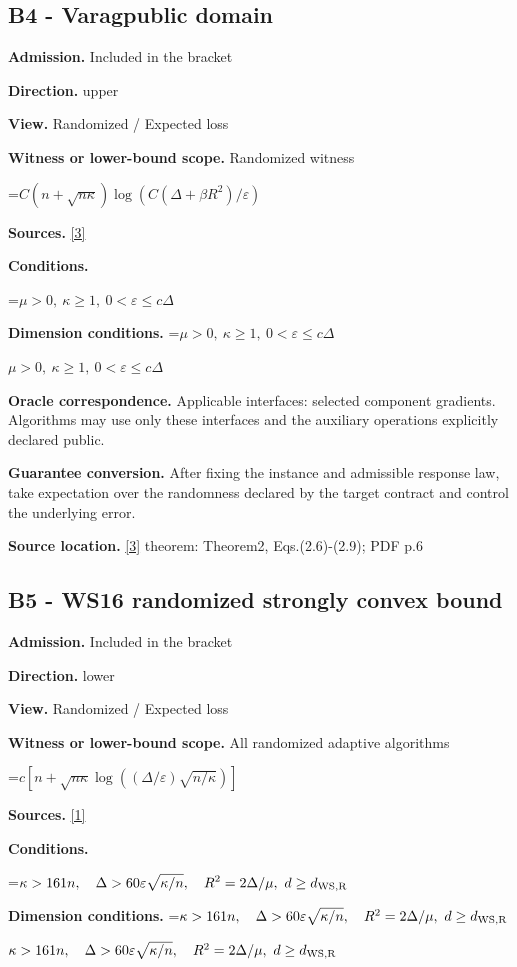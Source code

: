 \documentclass[10pt,a4paper]{article}
\newcommand{\AtlasMath}[1]{\par\begingroup\centering\setbox0=\hbox{$\displaystyle #1$}\ifdim\wd0>1.4\linewidth\typeout{ATLAS WIDE FORMULA: \the\wd0}\fi\ifdim\wd0>\linewidth\resizebox{\linewidth}{!}{\box0}\else\box0\fi\par\endgroup}
\newcommand{\AtlasInlineMath}[1]{\begingroup\setbox0=\hbox{$#1$}\ifdim\wd0>.4\linewidth\endgroup\AtlasMath{#1}\else\endgroup$#1$\fi}
\begin{document}
\subsection{B4 - Varagpublic domain}
\textbf{Admission.} Included in the bracket

\textbf{Direction.} upper

\textbf{View.} Randomized / Expected loss

\textbf{Witness or lower-bound scope.} Randomized witness

\AtlasMath{C(n+\sqrt{n\kappa})\log(C(\Delta+\beta R^2)/\varepsilon)}
\textbf{Sources.} \href{https://arxiv.org/pdf/1905.12412}{[3]}

\textbf{Conditions.} 
\AtlasMath{\mu>0,\ \kappa\ge1,\ 0<\varepsilon\le c\Delta}


\textbf{Dimension conditions.} \AtlasInlineMath{\mu>0,\ \kappa\ge1,\ 0<\varepsilon\le c\Delta}

\textbf{Oracle correspondence.} Applicable interfaces: selected component gradients. Algorithms may use only these interfaces and the auxiliary operations explicitly declared public.

\textbf{Guarantee conversion.} After fixing the instance and admissible response law, take expectation over the randomness declared by the target contract and control the underlying error.

\textbf{Source location.} \href{https://arxiv.org/pdf/1905.12412}{[3]} theorem: Theorem2, Eqs.(2.6)-(2.9); PDF p.6

\subsection{B5 - WS16 randomized strongly convex bound}
\textbf{Admission.} Included in the bracket

\textbf{Direction.} lower

\textbf{View.} Randomized / Expected loss

\textbf{Witness or lower-bound scope.} All randomized adaptive algorithms

\AtlasMath{c[n+\sqrt{n\kappa}\log((\Delta/\varepsilon)\sqrt{n/\kappa})]}
\textbf{Sources.} \href{https://arxiv.org/pdf/1605.08003v3}{[1]}

\textbf{Conditions.} 
\AtlasMath{\kappa>161n,\quad\Delta>60\varepsilon\sqrt{\kappa/n},\quad R^2=2\Delta/\mu,\ d\ge d_{\rm WS,R}}


\textbf{Dimension conditions.} \AtlasInlineMath{\kappa>161n,\quad\Delta>60\varepsilon\sqrt{\kappa/n},\quad R^2=2\Delta/\mu,\ d\ge d_{\rm WS,R}}
\end{document}
